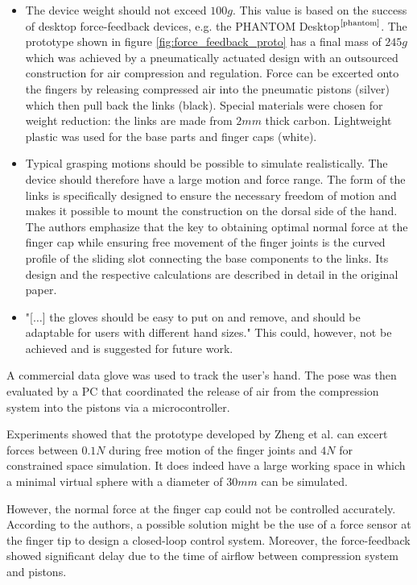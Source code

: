 \documentclass[hyperref, bachelorofscience]{cgvpub}
\newcommand{\newcite}[1]{$ ^{\text{\cite{#1}}} $}
\begin{document}
\newpage
\begin{itemize}
	\item The device weight should not exceed $ 100g $. This value is based on the success of desktop force-feedback devices, e.g. the PHANTOM Desktop\newcite{phantom}. The prototype shown in figure \ref{fig:force_feedback_proto} has a final mass of $ 245g $ which was achieved by a pneumatically actuated design with an outsourced construction for air compression and regulation. Force can be excerted onto the fingers by releasing compressed air into the pneumatic pistons (silver) which then pull back the links (black). Special materials were chosen for weight reduction: the links are made from $ 2mm $ thick carbon. Lightweight plastic was used for the base parts and finger caps (white).
	\item Typical grasping motions should be possible to simulate realistically. The device should therefore have a large motion and force range. The form of the links is specifically designed to ensure the necessary freedom of motion and makes it possible to mount the construction on the dorsal side of the hand. The authors emphasize that the key to obtaining optimal normal force at the finger cap while ensuring free movement of the finger joints is the curved profile of the sliding slot connecting the base components to the links. Its design and the respective calculations are described in detail in the original paper.
	\item "[$\dots$] the gloves should be easy to put on and remove, and should be adaptable for users with different hand sizes." This could, however, not be achieved and is suggested for future work.
\end{itemize}

A commercial data glove was used to track the user's hand. The pose was then evaluated by a PC that coordinated the release of air from the compression system into the pistons via a microcontroller. 

Experiments showed that the prototype developed by Zheng et al. can excert forces between $ 0.1N $ during free motion of the finger joints and $ 4N $ for constrained space simulation. It does indeed have a large working space in which a minimal virtual sphere with a diameter of $ 30mm $ can be simulated.

However, the normal force at the finger cap could not be controlled accurately. According to the authors, a possible solution might be the use of a force sensor at the finger tip to design a closed-loop control system. Moreover, the force-feedback showed significant delay due to the time of airflow between compression system and pistons.
\end{document}
